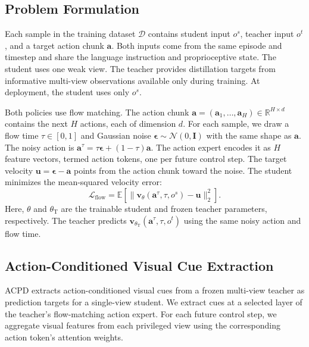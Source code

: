\documentclass{ELSP}
\begin{document}
\subsection{Problem Formulation}
\label{sec:problem}

Each sample in the training dataset $\mathcal{D}$ contains student input $o^s$, teacher input $o^t$, and a target action chunk $\mathbf{a}$. Both inputs come from the same episode and timestep and share the language instruction and proprioceptive state. The student uses one weak view. The teacher provides distillation targets from informative multi-view observations available only during training. At deployment, the student uses only $o^s$.

Both policies use flow matching. The action chunk $\mathbf{a}=(\mathbf{a}_1,\ldots,\mathbf{a}_H)\in\mathbb{R}^{H\times d}$ contains the next $H$ actions, each of dimension $d$. For each sample, we draw a flow time $\tau\in[0,1]$ and Gaussian noise $\boldsymbol{\epsilon}\sim\mathcal{N}(0,\mathbf{I})$ with the same shape as $\mathbf{a}$. The noisy action is $\mathbf{a}^{\tau}=\tau\boldsymbol{\epsilon}+(1-\tau)\mathbf{a}$. The action expert encodes it as $H$ feature vectors, termed action tokens, one per future control step. The target velocity $\mathbf{u}=\boldsymbol{\epsilon}-\mathbf{a}$ points from the action chunk toward the noise.
The student minimizes the mean-squared velocity error:
\begin{equation}
\mathcal{L}_{\text{flow}}
=
\mathbb{E}\!\left[
\big\|
\mathbf{v}_{\theta}(\mathbf{a}^{\tau},\tau,o^s)-\mathbf{u}
\big\|_2^2
\right].
\label{eq:flow}
\end{equation}
Here, $\theta$ and $\theta_{\mathrm{T}}$ are the trainable student and frozen teacher parameters, respectively. The teacher predicts $\mathbf{v}_{\theta_{\mathrm{T}}}(\mathbf{a}^{\tau},\tau,o^t)$ using the same noisy action and flow time.


\subsection{Action-Conditioned Visual Cue Extraction}
\label{sec:cue_extraction}

ACPD extracts action-conditioned visual cues from a frozen multi-view
teacher as prediction targets for a single-view student. We extract
cues at a selected layer of the teacher's flow-matching action expert.
For each future control step, we aggregate visual features from each
privileged view using the corresponding action token's attention weights.
\end{document}
